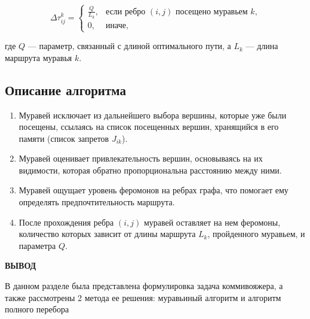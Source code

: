 \begin{equation}
    \label{update_phero_3}
    \Delta \tau_{ij}^k = 
    \begin{cases}
        \frac{Q}{L_k}, & \text{если ребро $(i, j)$ посещено муравьем $k$,} \\
        0, & \text{иначе,}
    \end{cases}
\end{equation}

где $Q$ — параметр, связанный с длиной оптимального пути, а $L_k$ — длина маршрута муравья $k$.

\subsection{Описание алгоритма}
\begin{enumerate}
    \item Муравей исключает из дальнейшего выбора вершины, которые уже были посещены, ссылаясь на список посещенных вершин, хранящийся в его памяти (список запретов $J_{ik}$).
    \item Муравей оценивает привлекательность вершин, основываясь на их видимости, которая обратно пропорциональна расстоянию между ними.
    \item Муравей ощущает уровень феромонов на ребрах графа, что помогает ему определять предпочтительность маршрута.
    \item После прохождения ребра $(i, j)$ муравей оставляет на нем феромоны, количество которых зависит от длины маршрута $L_k$, пройденного муравьем, и параметра $Q$.
\end{enumerate}

\textbf{ВЫВОД}

В данном разделе была представлена формулировка задача коммивояжера, а также рассмотрены 2 метода ее решения: муравьиный алгоритм и алгоритм полного перебора